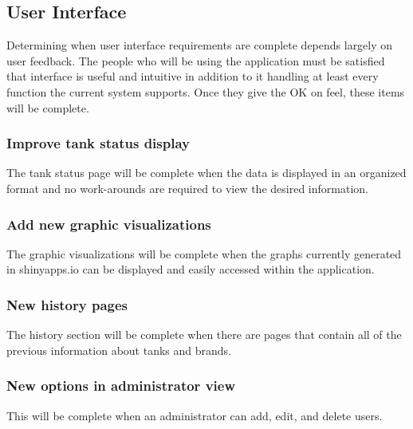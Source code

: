    \subsection{User Interface}
        Determining when user interface requirements are complete depends largely on user feedback. The people who will be using the application must be satisfied that interface is useful and intuitive in addition to it handling at least every function the current system supports. Once they give the OK on feel, these items will be complete.
        \subsubsection{Improve tank status display}
            The tank status page will be complete when the data is displayed in an organized format and no work-arounds are required to view the desired information.
        \subsubsection{Add new graphic visualizations}
            The graphic visualizations will be complete when the graphs currently generated in shinyapps.io can be displayed and easily accessed within the application.
        \subsubsection{New history pages}
            The history section will be complete when there are pages that contain all of the previous information about tanks and brands.
        \subsubsection{New options in administrator view}
            This will be complete when an administrator can add, edit, and delete users.

